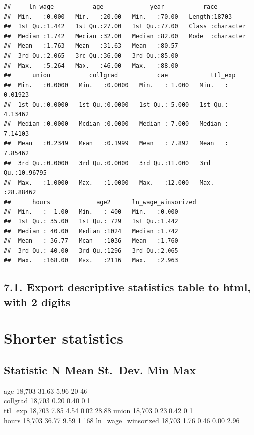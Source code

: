 \documentclass[
]{article}
\begin{document}
\begin{verbatim}
##     ln_wage           age             year           race          
##  Min.   :0.000   Min.   :20.00   Min.   :70.00   Length:18703      
##  1st Qu.:1.442   1st Qu.:27.00   1st Qu.:77.00   Class :character  
##  Median :1.742   Median :32.00   Median :82.00   Mode  :character  
##  Mean   :1.763   Mean   :31.63   Mean   :80.57                     
##  3rd Qu.:2.065   3rd Qu.:36.00   3rd Qu.:85.00                     
##  Max.   :5.264   Max.   :46.00   Max.   :88.00                     
##      union           collgrad           cae            ttl_exp        
##  Min.   :0.0000   Min.   :0.0000   Min.   : 1.000   Min.   : 0.01923  
##  1st Qu.:0.0000   1st Qu.:0.0000   1st Qu.: 5.000   1st Qu.: 4.13462  
##  Median :0.0000   Median :0.0000   Median : 7.000   Median : 7.14103  
##  Mean   :0.2349   Mean   :0.1999   Mean   : 7.892   Mean   : 7.85462  
##  3rd Qu.:0.0000   3rd Qu.:0.0000   3rd Qu.:11.000   3rd Qu.:10.96795  
##  Max.   :1.0000   Max.   :1.0000   Max.   :12.000   Max.   :28.88462  
##      hours             age2      ln_wage_winsorized
##  Min.   :  1.00   Min.   : 400   Min.   :0.000     
##  1st Qu.: 35.00   1st Qu.: 729   1st Qu.:1.442     
##  Median : 40.00   Median :1024   Median :1.742     
##  Mean   : 36.77   Mean   :1036   Mean   :1.760     
##  3rd Qu.: 40.00   3rd Qu.:1296   3rd Qu.:2.065     
##  Max.   :168.00   Max.   :2116   Max.   :2.963
\end{verbatim}

\hypertarget{export-descriptive-statistics-table-to-html-with-2-digits}{%
\subsection{7.1. Export descriptive statistics table to html, with 2
digits}\label{export-descriptive-statistics-table-to-html-with-2-digits}}

\hypertarget{shorter-statistics}{%
\section{Shorter statistics}\label{shorter-statistics}}

\hypertarget{statistic-n-mean-st.-dev.-min-max}{%
\subsection{Statistic N Mean St.~Dev. Min
Max}\label{statistic-n-mean-st.-dev.-min-max}}

age 18,703 31.63 5.96 20 46\\
collgrad 18,703 0.20 0.40 0 1\\
ttl\_exp 18,703 7.85 4.54 0.02 28.88 union 18,703 0.23 0.42 0 1\\
hours 18,703 36.77 9.59 1 168 ln\_wage\_winsorized 18,703 1.76 0.46 0.00
2.96 ---------------------------------------------------
\end{document}
